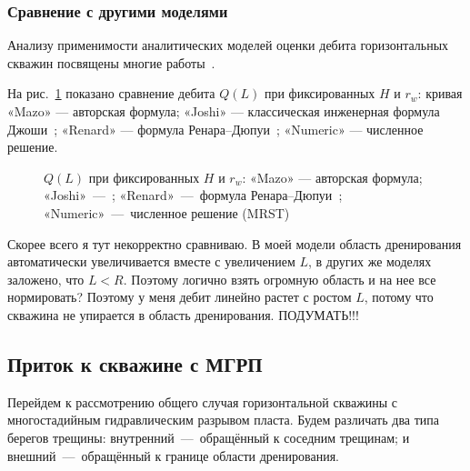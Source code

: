 \documentclass{article}
\begin{document}
\subsubsection{Сравнение с другими моделями}
Анализу применимости аналитических моделей оценки дебита горизонтальных скважин посвящены многие 
работы~\cite{lit:kham_shubin2018,lit:kham_nasybullin2023}.

На рис.~\ref{fig:kham_compare_hw_mrst} показано сравнение дебита $Q(L)$ при фиксированных $H$ и $r_w$:
кривая «Mazo» — авторская формула; «Joshi» — классическая инженерная формула Джоши~\cite{lit:kham_joshi1988};
«Renard» — формула Ренара–Дюпуи~\cite{lit:kham_renard_dupuy1991}; «Numeric» — численное решение.
\begin{figure}[H]
	\centering
	
	\caption{$Q(L)$ при фиксированных $H$ и $r_w$: «Mazo» — авторская формула; «Joshi»~---~\cite{lit:kham_joshi1988}; 
	«Renard»~---~формула Ренара–Дюпуи~\cite{lit:kham_renard_dupuy1991}; «Numeric»~---~численное решение (MRST)}
	\label{fig:kham_compare_hw_mrst}
\end{figure}

{\color{red} Скорее всего я тут некорректно сравниваю. В моей модели область дренирования автоматически увеличивается вместе с увеличением 
$L$, в других же моделях заложено, что $L < R$. Поэтому логично взять огромную область и на нее все нормировать? 
Поэтому у меня дебит линейно растет с ростом $L$, потому что скважина не упирается в область дренирования. ПОДУМАТЬ!!!}

\subsection{Приток к скважине с МГРП}
Перейдем к рассмотрению общего случая горизонтальной скважины с многостадийным гидравлическим разрывом пласта.
Будем различать два типа берегов трещины: внутренний~---~обращённый к соседним трещинам; 
и внешний~---~обращённый к границе области дренирования. 
\end{document}
